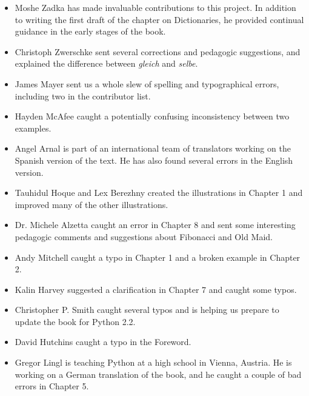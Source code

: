 \documentclass[10pt]{book}
\begin{document}
\begin{itemize}

\item Moshe Zadka has made invaluable contributions to this project.
In addition to writing the first draft of the chapter on Dictionaries, he
provided continual guidance in the early stages of the book.


\item Christoph Zwerschke sent several corrections and
pedagogic suggestions, and explained the difference between {\em gleich}
and {\em selbe}.

\item James Mayer sent us a whole slew of spelling and
typographical errors, including two in the contributor list.


\item Hayden McAfee caught a potentially confusing inconsistency
between two examples.

\item Angel Arnal is part of an international team of translators
working on the Spanish version of the text.  He has also found several
errors in the English version.

\item Tauhidul Hoque and Lex Berezhny created the illustrations
in Chapter 1 and improved many of the other illustrations.

\item Dr. Michele Alzetta caught an error in Chapter 8 and sent
some interesting pedagogic comments and suggestions about Fibonacci
and Old Maid.

\item Andy Mitchell caught a typo in Chapter 1 and a broken example
in Chapter 2.

\item Kalin Harvey suggested a clarification in Chapter 7 and
caught some typos.

\item Christopher P. Smith caught several typos and is helping us
prepare to update the book for Python 2.2.

\item David Hutchins caught a typo in the Foreword.

\item Gregor Lingl is teaching Python at a high school in Vienna,
Austria.  He is working on a German translation of the book,
and he caught a couple of bad errors in Chapter 5.


\end{itemize}
\end{document}
